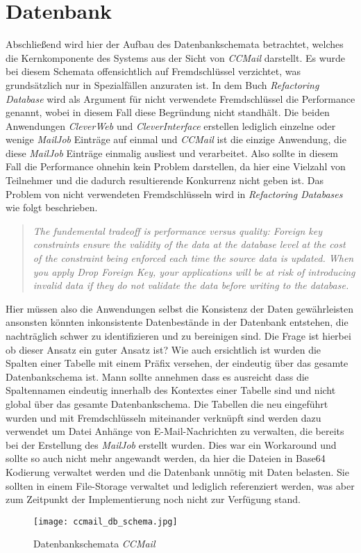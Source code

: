 \section{Datenbank}
\label{sec:ccmail-datanbank}
Abschließend wird hier der Aufbau des Datenbankschemata betrachtet, welches die Kernkomponente des Systems aus der Sicht von \emph{CCMail} darstellt. Es wurde bei diesem Schemata offensichtlich auf Fremdschlüssel verzichtet, was grundsätzlich nur in Spezialfällen anzuraten ist. In dem Buch \emph{Refactoring Database} \cite[213]{refactoreDatabase} wird als Argument für nicht verwendete Fremdschlüssel die Performance genannt, wobei in diesem Fall diese Begründung nicht standhält. Die beiden Anwendungen \emph{CleverWeb} und \emph{CleverInterface} erstellen lediglich einzelne oder wenige \emph{MailJob} Einträge auf einmal und \emph{CCMail} ist die einzige Anwendung, die diese \emph{MailJob} Einträge einmalig ausliest und verarbeitet. Also sollte in diesem Fall die Performance ohnehin kein Problem darstellen, da hier eine Vielzahl von Teilnehmer und die dadurch resultierende Konkurrenz nicht geben ist. Das Problem von nicht verwendeten Fremdschlüsseln wird in \emph{Refactoring Databases} \cite[213]{refactoreDatabase} wie folgt beschrieben.
\begin{quote}
\emph{The fundemental tradeoff is performance versus quality: Foreign key constraints ensure the validity of the data at the database level at the cost of the constraint being enforced each time the source data is updated. When you apply Drop Foreign Key, your applications will be at risk of introducing invalid data if they do not validate the data before writing to the database.}
\end{quote}
Hier müssen also die Anwendungen selbst die Konsistenz der Daten gewährleisten ansonsten könnten inkonsistente Datenbestände in der Datenbank entstehen, die nachträglich schwer zu identifizieren und zu bereinigen sind. Die Frage ist hierbei ob dieser Ansatz ein guter Ansatz ist?
\newline
\newline
Wie auch ersichtlich ist wurden die Spalten einer Tabelle mit einem Präfix versehen, der eindeutig über das gesamte Datenbankschema ist. Mann sollte annehmen dass es ausreicht dass die Spaltennamen eindeutig innerhalb des Kontextes einer Tabelle sind und nicht global über das gesamte Datenbankschema. Die Tabellen die neu eingeführt wurden und mit Fremdschlüsseln miteinander verknüpft sind werden dazu verwendet um Datei Anhänge von E-Mail-Nachrichten zu verwalten, die bereits bei der Erstellung des \emph{MailJob} erstellt wurden. Dies war ein Workaround und sollte so auch nicht mehr angewandt werden, da hier die Dateien in Base64 Kodierung verwaltet werden und die Datenbank unnötig mit Daten belasten. Sie sollten in einem File-Storage verwaltet und lediglich referenziert werden, was aber zum Zeitpunkt der Implementierung noch nicht zur Verfügung stand. 
\begin{figure}[h]
\centering
\texttt{[image: ccmail\_db\_schema.jpg]} 
\caption{Datenbankschemata \emph{CCMail}}
\label{fig:ccmail-db-schema}
\end{figure}
